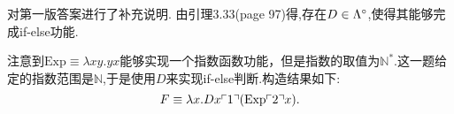 \begin{solution}

{\color {red} {对第一版答案进行了补充说明.}}
由引理3.33(page 97)得,存在$D\in\Lambda^\circ$,使得其能够完成if-else功能.

注意到$\mathrm{Exp} \equiv \lambda xy.yx $能够实现一个指数函数功能，但是指数的取值为$\mathbb{N}^{*}$.这一题给定的指数范围是$\mathbb{N}$,于是使用$D$来实现if-else判断.构造结果如下:
    $$F\equiv \lambda x.Dx\ulcorner{1}\urcorner(\mathrm{Exp}\ulcorner{2}\urcorner x).$$
\end{solution}